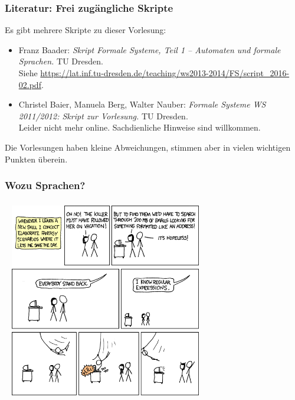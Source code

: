 \documentclass[onlymath]{beamer}
\begin{document}
\begin{frame}\frametitle{Literatur: Frei zugängliche Skripte}

Es gibt mehrere Skripte zu dieser Vorlesung:
\begin{itemize}
\item Franz Baader: \emph{Skript Formale Systeme, Teil 1 -- Automaten und formale Sprachen.} TU Dresden.
\\{\tiny Siehe \url{https://lat.inf.tu-dresden.de/teaching/ws2013-2014/FS/script_2016-02.pdf}}.
\item Christel Baier, Manuela Berg, Walter Nauber: \emph{Formale Systeme WS 2011/2012: Skript zur Vorlesung.} TU Dresden.
\\{\tiny Leider nicht mehr online. Sachdienliche Hinweise sind willkommen.}
\end{itemize}

Die Vorlesungen haben kleine Abweichungen, stimmen aber in vielen wichtigen Punkten überein.

\end{frame}



\begin{frame}\frametitle{Wozu Sprachen?}

\end{frame}

\begin{frame}\frametitle{}

~\hfill
\includegraphics[height=8.5cm]{images/xkcd-regexps}
\hfill~

\end{frame}
\end{document}
